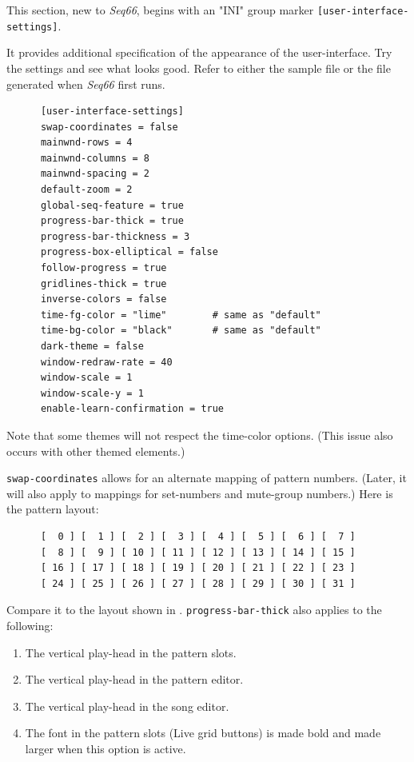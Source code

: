   This section, new to \textsl{Seq66}, begins with an
   "INI" group marker \texttt{[user-interface-settings]}.

   It provides additional
   specification of the appearance of the user-interface.
   Try the settings and see what looks good.
   Refer to either the sample file or the file generated when \textsl{Seq66}
   first runs.

   \begin{verbatim}
      [user-interface-settings]
      swap-coordinates = false
      mainwnd-rows = 4
      mainwnd-columns = 8
      mainwnd-spacing = 2
      default-zoom = 2
      global-seq-feature = true
      progress-bar-thick = true
      progress-bar-thickness = 3
      progress-box-elliptical = false
      follow-progress = true
      gridlines-thick = true
      inverse-colors = false
      time-fg-color = "lime"        # same as "default"
      time-bg-color = "black"       # same as "default"
      dark-theme = false
      window-redraw-rate = 40
      window-scale = 1
      window-scale-y = 1
      enable-learn-confirmation = true
   \end{verbatim}

   Note that some themes will not respect the time-color options.
   (This issue also occurs with other themed elements.)

   \texttt{swap-coordinates} allows for an alternate mapping of pattern
   numbers.  (Later, it will also apply to mappings for set-numbers and
   mute-group numbers.)  Here is the pattern layout:

   \begin{verbatim}
      [  0 ] [  1 ] [  2 ] [  3 ] [  4 ] [  5 ] [  6 ] [  7 ]
      [  8 ] [  9 ] [ 10 ] [ 11 ] [ 12 ] [ 13 ] [ 14 ] [ 15 ]
      [ 16 ] [ 17 ] [ 18 ] [ 19 ] [ 20 ] [ 21 ] [ 22 ] [ 23 ]
      [ 24 ] [ 25 ] [ 26 ] [ 27 ] [ 28 ] [ 29 ] [ 30 ] [ 31 ]
   \end{verbatim}

   Compare it to the layout shown in
   .
   \texttt{progress-bar-thick} also applies to the following:

   \begin{enumerate}
      \item The vertical play-head in the pattern slots.
      \item The vertical play-head in the pattern editor.
      \item The vertical play-head in the song editor.
      \item The font in the pattern slots (Live grid buttons)
         is made bold and made larger when this option is active.
   \end{enumerate}

